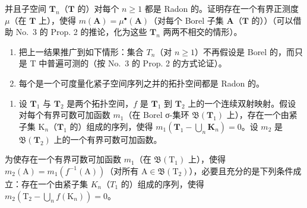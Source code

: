 并且子空间 \(\mathbf{T}_n\)（\(\mathbf{T}\) 的）对每个 \(n \geqslant 1\) 都是 Radon 的。证明存在一个有界正测度 \(\mu\)（在 \(\mathbf{T}\) 上），使得 \(m(\mathbf{A}) = \mu^{\bullet}(\mathbf{A})\)（对每个 Borel 子集 \(\mathbf{A}\)（\(\mathbf{T}\) 的））（可以借助 No.~3 的 Prop. 2 的推论，化为这些 \(\mathbf{T}_n\) 两两不相交的情形）。

\begin{enumerate}
\def\labelenumi{\alph{enumi})}
\setcounter{enumi}{1}
\item
  把上一结果推广到如下情形：集合 \(T_{n}\)（对 \(n \geqslant 1\)）不再假设是 Borel 的，而只是 T 中普遍可测的（按 No.~3 的 Prop. 2 的方式论证）。
\item
  每个是一个可度量化紧子空间序列之并的拓扑空间都是 Radon 的。
\end{enumerate}

\begin{enumerate}
\def\labelenumi{\arabic{enumi})}
\setcounter{enumi}{17}
\tightlist
\item
  设 \(\mathbf{T}_1\) 与 \(\mathbf{T}_2\) 是两个拓扑空间，\(f\) 是 \(\mathbf{T}_1\) 到 \(\mathbf{T}_2\) 上的一个连续双射映射。假设对每个有界可数可加函数 \(m_1\)（在 Borel σ-集环 \(\mathfrak{B}(\mathbf{T}_1)\) 上），存在一个由紧子集 \(\mathrm{K}_n\)（\(\mathbf{T}_1\) 的）组成的序列，使得 \(m_1(\mathbf{T}_1 - \bigcup_{n}\mathbf{K}_n) = 0\)。设 \(m_2\) 是 \(\mathfrak{B}(\mathbf{T}_2)\) 上的一个有界可数可加函数。
\end{enumerate}

为使存在一个有界可数可加函数 \(m_{1}\)（在 \(\mathfrak{B}(\mathrm{T}_{1})\) 上），使得 \(m_{2}(\mathrm{A}) = m_{1}(f^{-1}(\mathrm{A}))\)（对所有 \(\mathrm{A} \in \mathfrak{B}(\mathrm{T}_{2})\)），必要且充分的是下列条件成立：存在一个由紧子集 \(K_{n}\)（\(T_{1}\) 的）组成的序列，使得 \(m_{2}(\mathrm{T}_{2} - \bigcup_{n} f(\mathrm{K}_{n})) = 0\)。

